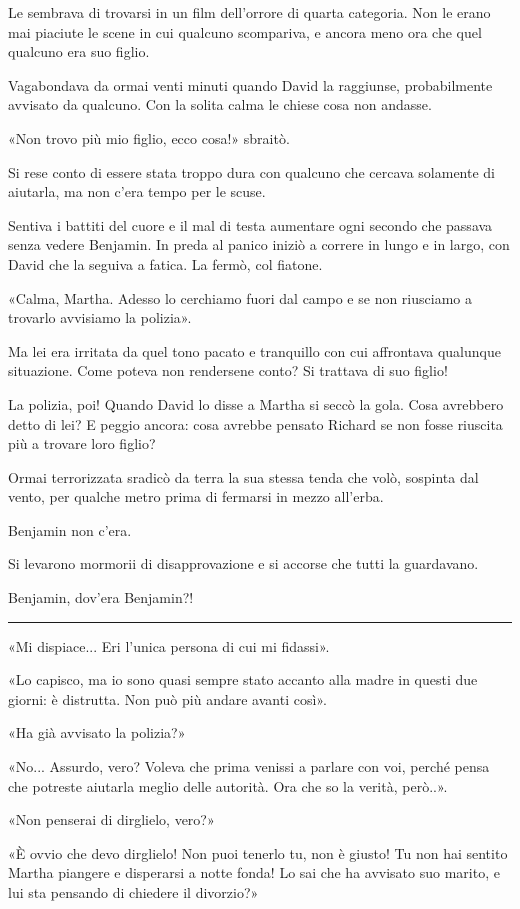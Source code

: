 \documentclass[a4paper,11pt,oneside,openright,final]{memoir}
\begin{document}
Le sembrava di trovarsi in un film dell'orrore di quarta categoria. Non le erano
mai piaciute le scene in cui qualcuno scompariva, e ancora meno ora che quel
qualcuno era suo figlio.

Vagabondava da ormai venti minuti quando David la raggiunse, probabilmente
avvisato da qualcuno. Con la solita calma le chiese cosa non andasse.

«Non trovo più mio figlio, ecco cosa!» sbraitò.

Si rese conto di essere stata troppo dura con qualcuno che cercava solamente di
aiutarla, ma non c'era tempo per le scuse.

Sentiva i battiti del cuore e il mal di testa aumentare ogni secondo che passava
senza vedere Benjamin. In preda al panico iniziò a correre in lungo e in largo,
con David che la seguiva a fatica. La fermò, col fiatone.

«Calma, Martha. Adesso lo cerchiamo fuori dal campo e se non riusciamo a
trovarlo avvisiamo la polizia».

Ma lei era irritata da quel tono pacato e tranquillo con cui affrontava
qualunque situazione. Come poteva non rendersene conto? Si trattava di suo
figlio!

La polizia, poi! Quando David lo disse a Martha si seccò la gola. Cosa
avrebbero detto di lei? E peggio ancora: cosa avrebbe pensato Richard se non
fosse riuscita più a trovare loro figlio?

Ormai terrorizzata sradicò da terra la sua stessa tenda che volò, sospinta dal
vento, per qualche metro prima di fermarsi in mezzo all'erba.

Benjamin non c'era.

Si levarono mormorii di disapprovazione e si accorse che tutti la guardavano.

Benjamin, dov'era Benjamin?!


\plainbreak{1}

«Mi dispiace... Eri l'unica persona di cui mi fidassi».

«Lo capisco, ma io sono quasi sempre stato accanto alla madre in questi due
giorni: è distrutta. Non può più andare avanti così».

«Ha già avvisato la polizia?»

«No... Assurdo, vero? Voleva che prima venissi a parlare con voi, perché pensa
che potreste aiutarla meglio delle autorità. Ora che so la verità, però..».

«Non penserai di dirglielo, vero?»

«È ovvio che devo dirglielo! Non puoi tenerlo tu, non è giusto! Tu non hai
sentito Martha piangere e disperarsi a notte fonda! Lo sai che ha avvisato suo
marito, e lui sta pensando di chiedere il divorzio?»
\end{document}
